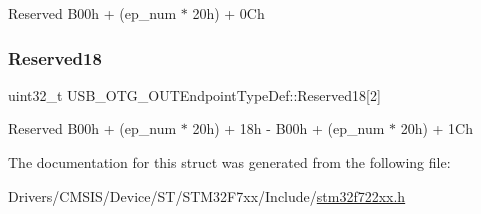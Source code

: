 Reserved B00h + (ep\+\_\+num $\ast$ 20h) + 0Ch \mbox{\label{struct_u_s_b___o_t_g___o_u_t_endpoint_type_def_a51b162457add1bb7cc254b7aeb9f94bd}} 
\subsubsection{\texorpdfstring{Reserved18}{Reserved18}}
{\footnotesize\ttfamily uint32\+\_\+t U\+S\+B\+\_\+\+O\+T\+G\+\_\+\+O\+U\+T\+Endpoint\+Type\+Def\+::\+Reserved18\mbox{[}2\mbox{]}}

Reserved B00h + (ep\+\_\+num $\ast$ 20h) + 18h -\/ B00h + (ep\+\_\+num $\ast$ 20h) + 1Ch 

The documentation for this struct was generated from the following file\+:\begin{DoxyCompactItemize}
\item 
Drivers/\+C\+M\+S\+I\+S/\+Device/\+S\+T/\+S\+T\+M32\+F7xx/\+Include/\mbox{\hyperlink{stm32f722xx_8h}{stm32f722xx.\+h}}\end{DoxyCompactItemize}
